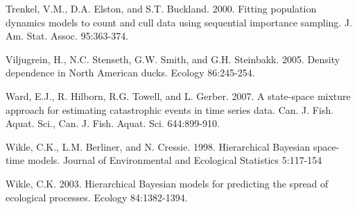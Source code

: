 Trenkel, V.M., D.A. Elston, and S.T. Buckland. 2000. Fitting population dynamics models to count and cull data using sequential importance sampling. J. Am. Stat. Assoc. 95:363-374.

Viljugrein, H., N.C. Stenseth, G.W. Smith, and G.H. Steinbakk. 2005. Density dependence in North American ducks. Ecology 86:245-254.

Ward, E.J., R. Hilborn, R.G. Towell, and L. Gerber. 2007. A state-space mixture approach for estimating catastrophic events in time series data. Can. J. Fish. Aquat. Sci., Can. J. Fish. Aquat. Sci. 644:899-910.

Wikle, C.K., L.M. Berliner, and N. Cressie. 1998. Hierarchical Bayesian space-time models. Journal of Environmental and Ecological Statistics 5:117-154

Wikle, C.K. 2003. Hierarchical Bayesian models for predicting the spread of ecological processes. Ecology 84:1382-1394.
